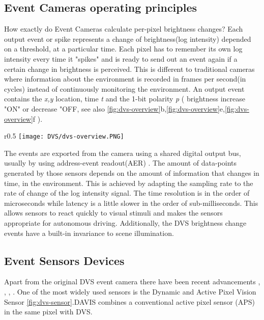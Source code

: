 \documentclass[12pt]{report}
\begin{document}
\subsection{Event Cameras operating principles}
How exactly do Event Cameras calculate per-pixel brightness changes? Each output event or spike represents a change of brightness(log intensity) depended on a threshold, at a particular time. Each pixel has to remember its own log intensity every time it "spikes" and is ready to send out an event again if a certain change in brightness is perceived. This is different to traditional cameras where information about the environment is recorded in frames per second(in cycles) instead of continuously monitoring the environment. An output event contains the \textit{x,y}  location, time \textit{t} and the 1-bit polarity \textit{p} ( brightness increase "ON" or decrease "OFF, see also \ref{fig:dvs-overview}b,\ref{fig:dvs-overview}e,\ref{fig:dvs-overview}f \cite{davis}).

\begin{wrapfigure}{r}{0.5\textwidth} %
    \centering
     \texttt{[image: DVS/dvs-overview.PNG]}
    \caption{DAVIS camera}
    \label{fig:dvs-overview}
\end{wrapfigure}

The events are exported from the camera using a shared digital output bus, usually by using address-event readout(AER) \cite{boahen2004} \cite{liu2015} . The amount of data-points generated by those sensors depends on the amount of information that changes in time, in the environment. This is achieved by adapting the sampling rate to the rate of change of the log intensity signal. The time resolution is in the order of microseconds while latency is a little slower in the order of sub-milliseconds. This allows sensors to react quickly to visual stimuli and makes the sensors appropriate for autonomous driving. Additionally, the DVS brightness change events have a built-in invariance to scene illumination.

\subsection{Event Sensors Devices}
Apart from the original DVS event camera \cite{Lichtsteiner2008} there have been recent advancements \cite{posch2014} , \cite{liu2015}, \cite{indiveri2015}, \cite{delbruck2010} .
One of the most widely used sensors is the Dynamic and Active Pixel Vision Sensor \cite{davis} \ref{fig:dvs-sensor}.DAVIS combines a conventional active pixel sensor (APS) \cite{fossum1997} in the same pixel with DVS.   
\end{document}
